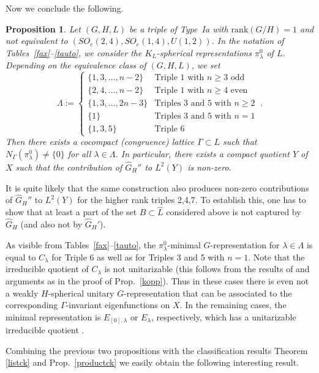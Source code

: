 \documentclass[10]{amsart}
\newtheorem{pro}[thm]{Proposition}
\theoremstyle{remark}
\theoremstyle{definition}
\numberwithin{equation}{section}
\newcommand{\rank}{\text{rank}}
\begin{document}
{Now we conclude the following.

\begin{pro}\label{nonu}
Let $(G,H,L)$ be a triple of Type~Ia with $\rank(G/H)=1$ and not equivalent to $(SO_e(2,4),SO_e(1,4),U(1,2))$. In the notation of Tables~\ref{fax}--\ref{tauto}, we consider the $K_L$-spherical representations $\pi^0_\lambda$ of $L$. Depending on the equivalence class of $(G,H,L)$, we set
$$
\Lambda:=\left\{\begin{array}{ll} 
\{1,3,\dots,n-2\}&\mbox{Triple 1 with }n\ge 3\mbox{ odd}\\
\{2,4,\dots,n-2\}&\mbox{Triple 1 with }n\ge 4\mbox{ even}\\
\{1,3,\dots,2n-3\}&\mbox{Triples 3 and 5 with }n\ge 2\\
\{1\}&\mbox{Triples 3 and 5 with }n=1\\
\{1,3,5\}&\mbox{Triple 6}
\end{array}\right. \ . 
$$ 
Then there exists a cocompact (congruence) lattice $\Gamma\subset L$ such that
$N_\Gamma(\pi_\lambda^0)\ne\{0\}$ for all $\lambda\in\Lambda$. In particular, there exists a compact quotient $Y$ of $X$ such that the  contribution of $\widehat G_H''$ to $L^2(Y)$ is non-zero.
\end{pro}

It is quite likely that the same construction also produces non-zero contributions of $\widehat G_H''$ to $L^2(Y)$ for the higher rank triples 2,4,7. To establish this,
one has to show that at least a part of the set $B\subset \widehat L$ considered above is not captured by $\widehat G_H$ (and also not by $\widehat G_H'$).

 
As visible from Tables~\ref{fax}--\ref{tauto}, the $\pi_\lambda^0$-minimal $G$-representation for $\lambda\in\Lambda$ is equal to $C_\lambda$ for Triple 6 as well as
for Triples 3 and 5 with $n=1$. Note that the irreducible quotient of $C_\lambda$ is not unitarizable (this follows from the results of \cite{HoTa93} and arguments as in the proof of 
Prop.~\ref{kopp}). Thus in these cases there is even not a weakly $H$-spherical unitary $G$-representation
that can be associated to the corresponding $\Gamma$-invariant eigenfunctions on $X$. In the remaining cases, the minimal representation is $E_{[0],\lambda}$ or $E_\lambda$, respectively, which has a unitarizable irreducible quotient \cite{HoTa93}.

Combining the previous two propositions with the classification results Theorem \ref{listck} and Prop.~\ref{productck} we easily obtain the following interesting result.

}
\end{document}
